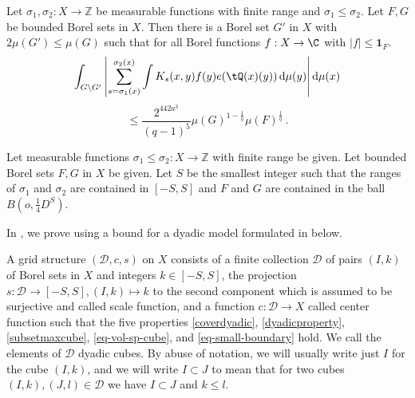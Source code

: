 \begin{proposition}
\label{finitary-Carleson}
\leanok
{}
Let ${\sigma_1},\sigma_2\colon X\to \mathbb{Z}$ be measurable functions with finite range and ${\sigma_1}\leq \sigma_2$.  Let $F,G$ be bounded Borel sets in $X$. Then there is a Borel set $G'$ in $X$ with $2\mu(G')\leq \mu(G)$ such that
for all Borel functions $f:X\to \C$ with $|f|\le \mathbf{1}_F$.
\begin{equation*}
    \int_{G \setminus G'} \left|\sum_{s={\sigma_1}(x)}^{{\sigma_2}(x)} \int K_s(x,y) f(y) e(\tQ(x)(y)) \, \mathrm{d}\mu(y) \right| \mathrm{d}\mu(x)
\end{equation*}
\begin{equation}
    \label{eq-linearized}
    \le \frac{2^{442a^3}}{(q-1)^5} \mu(G)^{1-\frac{1}{q}} \mu(F)^{\frac 1 q}\,.
\end{equation}
\end{proposition}
Let measurable functions ${\sigma_1}\leq \sigma_2\colon X\to \mathbb{Z}$ with finite range be given.
Let bounded Borel sets $F,G$ in $X$ be given.
Let $S$ be the smallest integer such that the ranges of
$\sigma_1$ and $\sigma_2$ are contained in $[-S,S]$ and $F$ and $G$ are contained
in the ball $B(o, \frac{1}{4}D^S)$.

In , we prove  using a
bound for a dyadic model formulated in  below.

A grid structure $(\mathcal{D}, c, s)$ on $X$ consists of a finite collection $\mathcal{D}$ of pairs $(I, k)$ of Borel
sets in $X$ and integers $k \in [-S, S]$, the projection $s\colon \mathcal{D}\to [-S, S], (I, k) \mapsto k$ to the second component which is assumed to be surjective and
called scale function, and a function $c:\mathcal{D}\to X$
called center function such that the five properties
\eqref{coverdyadic}, \eqref{dyadicproperty}, \eqref{subsetmaxcube},
\eqref{eq-vol-sp-cube}, and \eqref{eq-small-boundary} hold. We call the elements of $\mathcal{D}$ dyadic cubes. By abuse of notation, we will usually write just $I$ for the cube $(I,k)$, and we will write $I \subset J$ to mean that for two cubes $(I,k), (J, l) \in \mathcal{D}$ we have $I \subset J$ and $k \le l$.

